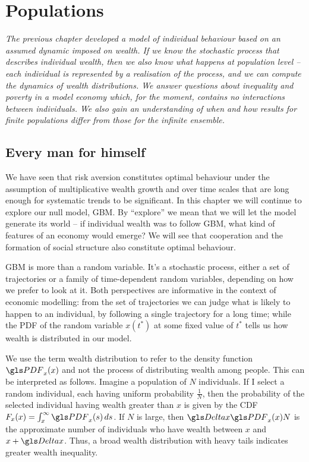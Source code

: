 \newpage


\section{Populations}
{\it 
The previous chapter developed a model of individual behaviour based on an
assumed dynamic imposed on wealth. If we know the stochastic process that describes
individual wealth, then we also know what happens at population level -- each individual
is represented by a realisation of the process, and we can compute 
the dynamics of wealth distributions. We answer questions about inequality and poverty in
a model economy which, for the moment, contains no interactions between individuals. We also gain an understanding of when and how results for finite populations differ from those for the infinite ensemble.}
\newpage


\subsection{Every man for himself}

We have seen that risk aversion constitutes optimal behaviour under the assumption 
of multiplicative wealth growth and over time scales that are long enough for systematic 
trends to be significant. In this chapter we will continue to explore our null model, 
GBM. By ``explore'' we mean that we will let the model generate its world -- if 
individual wealth was to follow GBM, what kind of features of an economy would emerge? 
We will see that cooperation and the formation of social structure also constitute 
optimal behaviour.

GBM is more than a random variable. It's a stochastic process, either a set of trajectories 
or a family of time-dependent random variables, depending on how we 
prefer to look at it.  Both perspectives are informative in the context of economic modelling:
from the set of trajectories we can judge what is likely to happen to an individual, 
\eg by following a single trajectory for a long time; while the PDF of the random 
variable $x(t^*)$ at some fixed value of $t^*$ tells us how wealth is distributed in our model. 

We use the term wealth distribution to refer to the density function $\PDF_x(x)$ and not the process of distributing wealth among people. This can be interpreted as follows. Imagine a population of $N$ individuals. If I select a random individual, each having uniform probability $\frac{1}{N}$, then the probability of the selected individual having wealth greater than $x$ is given by the CDF $F_x(x)=\int_x^\infty \PDF_x(s)\,ds$. If $N$ is large, then $\D x \PDF_x(x)N$ is the approximate number of individuals who have wealth between $x$ and $x+\D x$. Thus, a broad wealth distribution with heavy tails indicates greater wealth inequality.

